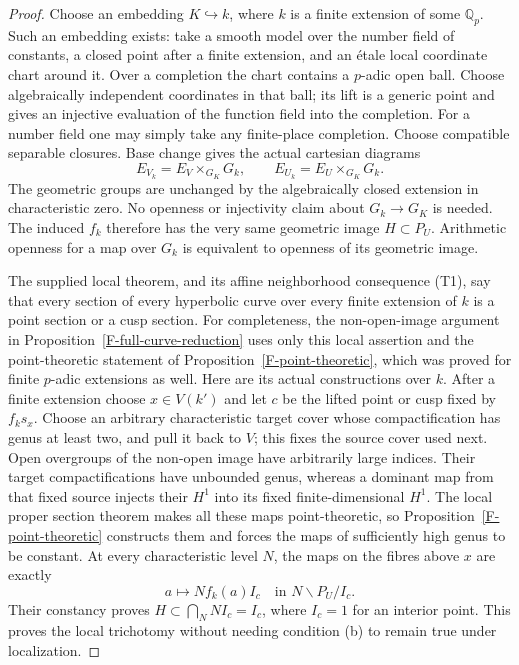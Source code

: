 \begin{proof}
Choose an embedding $K\hookrightarrow k$, where $k$ is a
finite extension of some $\mathbb Q_p$. Such an embedding
exists: take a smooth model over the number field of constants,
a closed point after a finite extension, and an \'etale local
coordinate chart around it. Over a completion the chart contains
a $p$-adic open ball. Choose algebraically independent coordinates
in that ball; its lift is a generic point and gives an injective
evaluation of the function field into the completion. For a
number field one may simply take any finite-place completion.
Choose compatible separable closures. Base change gives the
actual cartesian
diagrams
\[
 E_{V_k}=E_V\times_{G_K}G_k,\qquad
 E_{U_k}=E_U\times_{G_K}G_k.
\]
The geometric groups are unchanged by the algebraically closed
extension in characteristic zero. No openness or injectivity
claim about $G_k\to G_K$ is needed. The induced $f_k$ therefore
has the very same geometric image $H\subset P_U$. Arithmetic
openness for a map over $G_k$ is equivalent to openness of its
geometric image.

The supplied local theorem, and its affine neighborhood
consequence (T1), say that every section of every hyperbolic
curve over every finite extension of $k$ is a point section or
a cusp section. For completeness, the non-open-image argument
in Proposition~\ref{F-full-curve-reduction} uses only this
local assertion and the point-theoretic statement of
Proposition~\ref{F-point-theoretic}, which was proved for
finite $p$-adic extensions as well. Here are its actual
constructions over $k$. After a finite extension choose
$x\in V(k')$ and let $c$ be the lifted point or cusp fixed
by $f_k s_x$. Choose an arbitrary characteristic target cover
whose compactification has genus at least two, and pull it
back to $V$; this fixes the source cover used next. Open
overgroups of the non-open image have arbitrarily large
indices. Their target compactifications have unbounded genus,
whereas a dominant map from that fixed source injects their
$H^1$ into its fixed finite-dimensional $H^1$. The local
proper section theorem makes all these maps point-theoretic,
so Proposition~\ref{F-point-theoretic} constructs them and
forces the maps of sufficiently high genus to be constant.
At every characteristic level $N$, the maps on the fibres
above $x$ are exactly
\[
 a\longmapsto N f_k(a) I_c\quad\text{in }N\backslash P_U/I_c.
\]
Their constancy proves $H\subset\bigcap_NNI_c=I_c$, where
$I_c=1$ for an interior point. This proves the local trichotomy
without needing condition (b) to remain true under localization.


\end{proof}
